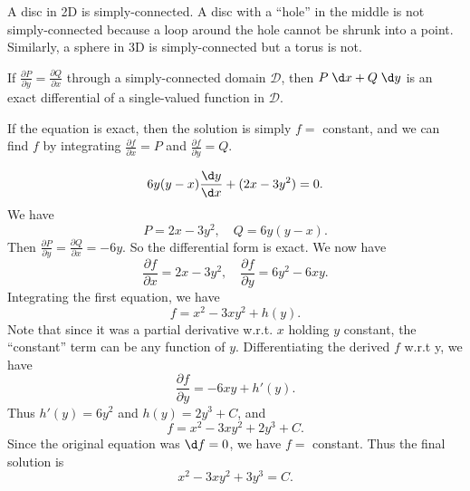 \documentclass[a4paper]{article}
\begin{document}
\begin{eg}
  A disc in 2D is simply-connected. A disc with a ``hole'' in the middle is not simply-connected because a loop around the hole cannot be shrunk into a point. Similarly, a sphere in 3D is simply-connected but a torus is not.
\end{eg}

\begin{thm}
  If $\frac{\partial P}{\partial y} = \frac{\partial Q}{\partial x}$ through a simply-connected domain $\mathcal{D}$, then $P\;\d x + Q\; \d y$ is an exact differential of a single-valued function in $\mathcal{D}$.
\end{thm}
If the equation is exact, then the solution is simply $f = $ constant, and we can find $f$ by integrating $\frac{\partial f}{\partial x} = P$ and $\frac{\partial f}{\partial y} = Q$.

\begin{eg}
  \[
    6y(y - x)\frac{\d y}{\d x} + (2x - 3y^2) = 0.
  \]
  We have
  \[
    P = 2x - 3y^2, \quad Q = 6y(y - x).
  \]
  Then $\frac{\partial P}{\partial y} = \frac{\partial Q}{\partial x} = -6y$. So the differential form is exact. We now have
  \[
    \frac{\partial f}{\partial x} = 2x - 3y^2, \quad \frac{\partial f}{\partial y} = 6y^2 - 6xy.
  \]
  Integrating the first equation, we have
  \[
    f = x^2 - 3xy^2 + h(y).
  \]
  Note that since it was a partial derivative w.r.t. $x$ holding $y$ constant, the ``constant'' term can be any function of $y$. Differentiating the derived $f$ w.r.t y, we have
  \[
    \frac{\partial f}{\partial y} = -6xy + h'(y).
  \]
  Thus $h'(y) = 6y^2$ and $h(y) = 2y^3 + C$, and
  \[
    f = x^2 - 3xy^2 + 2y^3 + C.
  \]
  Since the original equation was $\d f = 0$, we have $f = $ constant. Thus the final solution is
  \[
    x^2 - 3xy^2 + 3y^3 = C.
  \]
\end{eg}
\end{document}
